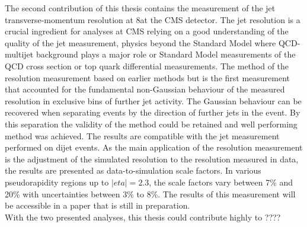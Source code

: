 The second contribution of this thesis contains the measurement of the jet transverse-momentum resolution at 8\tev at the CMS detector.
The jet \pt resolution is a crucial ingredient for analyses at CMS relying on a good understanding of the quality of the jet \pt measurement, \eg physics beyond the Standard Model where QCD-multijet background plays a major role or Standard Model measurements of the QCD cross section or top quark differential measurements.
The method of the resolution measurement based on earlier methods but is the first measurement that accounted for the fundamental non-Gaussian behaviour of the measured resolution in exclusive bins of further jet activity.
The Gaussian behaviour can be recovered when separating events by the direction of further jets in the event.
By this separation the validity of the method could be retained and well performing method was achieved.
The results are compatible with the jet \pt measurement performed on dijet events.
As the main application of the resolution measurement is the adjustment of the simulated resolution to the resolution measured in data, the results are presented as data-to-simulation scale factors.
In various pseudorapidity regions up to $|eta|=2.3$, the scale factors vary between 7\% and 20\% with uncertainties between 3\% to 8\%.
The results of this measurement will be accessible in a paper that is still in preparation.\\

With the two presented analyses, this thesis could contribute highly to ????
 





